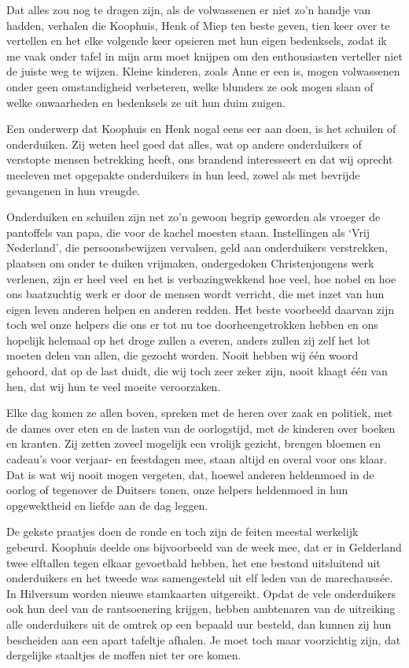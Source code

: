 \documentclass{book}
\begin{document}
Dat alles zou nog te dragen zijn, als de volwassenen er niet zo'n handje
van hadden, verhalen die Koophuis, Henk of Miep ten beste geven, tien
keer over te vertellen en het elke volgende keer opsieren met hun eigen
bedenksels, zodat ik me vaak onder tafel in mijn arm moet knijpen om den
enthousiasten verteller niet de juiste weg te wijzen. Kleine kinderen,
zoals Anne er een is, mogen volwassenen onder geen omstandigheid
verbeteren, welke blunders ze ook mogen slaan of welke onwaarheden en
bedenksels ze uit hun duim zuigen.

Een onderwerp dat Koophuis en Henk nogal eens eer aan doen, is het
schuilen of onderduiken. Zij weten heel goed dat alles, wat op andere
onderduikers of verstopte mensen betrekking heeft, ons brandend
interesseert en dat wij oprecht meeleven met opgepakte onderduikers in
hun leed, zowel als met bevrijde gevangenen in hun vreugde.

Onderduiken en schuilen zijn net zo'n gewoon begrip geworden als vroeger
de pantoffels van papa, die voor de kachel moesten staan. Instellingen
als `Vrij Nederland', die persoonsbewijzen vervalsen, geld aan
onderduikers verstrekken, plaatsen om onder te duiken vrijmaken,
ondergedoken Christenjongens werk verlenen, zijn er heel veel~en het is
verbazingwekkend hoe veel, hoe nobel en hoe ons baatzuchtig werk er door
de mensen wordt verricht, die met inzet van hun eigen leven anderen
helpen en anderen redden. Het beste voorbeeld daarvan zijn toch wel onze
helpers die ons er tot nu toe doorheengetrokken hebben en ons hopelijk
helemaal op het droge zullen a everen, anders zullen zij zelf het lot
moeten delen van allen, die gezocht worden. Nooit hebben wij één woord
gehoord, dat op de last duidt, die wij toch zeer zeker zijn, nooit
klaagt één van hen, dat wij hun te veel moeite veroorzaken.

Elke dag komen ze allen boven, spreken met de heren over zaak en
politiek, met de dames over eten en de lasten van de oorlogstijd, met de
kinderen over boeken en kranten. Zij zetten zoveel mogelijk een vrolijk
gezicht, brengen bloemen en cadeau's voor verjaar- en feestdagen mee,
staan altijd en overal voor ons klaar. Dat is wat wij nooit mogen
vergeten, dat, hoewel anderen heldenmoed in de oorlog of tegenover de
Duitsers tonen, onze helpers heldenmoed in hun opgewektheid en liefde
aan de dag leggen.

De gekste praatjes doen de ronde en toch zijn de feiten meestal
werkelijk gebeurd. Koophuis deelde ons bijvoorbeeld van de week mee, dat
er in Gelderland twee elftallen tegen elkaar gevoetbald hebben, het ene
bestond uitsluitend uit onderduikers en het tweede was samengesteld uit
elf leden van de marechaussée. In Hilversum worden nieuwe stamkaarten
uitgereikt. Opdat de vele onderduikers ook hun deel van de rantsoenering
krijgen, hebben ambtenaren van de uitreiking alle onderduikers uit de
omtrek op een bepaald uur besteld, dan kunnen zij hun bescheiden aan een
apart tafeltje afhalen. Je moet toch maar voorzichtig zijn, dat
dergelijke staaltjes de moffen niet ter ore komen.
\end{document}
